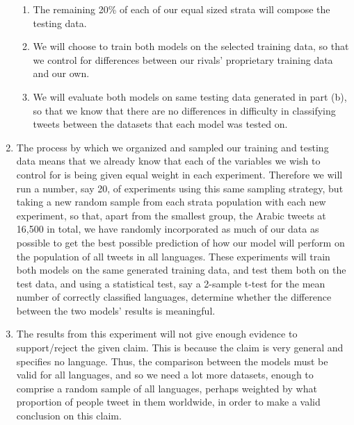 \documentclass[10pt,oneside,reqno]{amsart}
\theoremstyle{plain}
\theoremstyle{definition}
\begin{document}
\begin{enumerate}[label=\arabic*.]
\begin{enumerate}
\item The remaining 20\% of each of our equal sized strata will compose the testing data. \\

\item We will choose to train both models on the selected training data, so that we control for differences between our rivals' proprietary training data and our own. \\

\item We will evaluate both models on same testing data generated in part (b), so that we know that there are no differences in difficulty in classifying tweets between the datasets that each model was tested on. \\
\end{enumerate}

\item The process by which we organized and sampled our training and testing data means that we already know that each of the variables we wish to control for is being given equal weight in each experiment. Therefore we will run a number, say 20, of experiments using this same sampling strategy, but taking a new random sample from each strata population with each new experiment, so that, apart from the smallest group, the Arabic tweets at 16,500 in total, we have randomly incorporated as much of our data as possible to get the best possible prediction of how our model will perform on the population of all tweets in all languages. These experiments will train both models on the same generated training data, and test them both on the test data, and using a statistical test, say a 2-sample t-test for the mean number of correctly classified languages, determine whether the difference between the two models' results is meaningful. \\

\item The results from this experiment will not give enough evidence to support/reject the given claim. This is because the claim is very general and specifies no language. Thus, the comparison between the models must be valid for all languages, and so we need a lot more datasets, enough to comprise a random sample of all languages, perhaps weighted by what proportion of people tweet in them worldwide, in order to make a valid conclusion on this claim. 






\end{enumerate}
\end{document}
